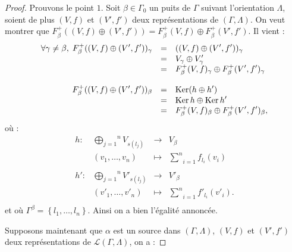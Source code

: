 \documentclass[a4paper,11pt]{article}
\DeclareMathOperator{\Ker}{Ker}
\newcommand{\dps}{\displaystyle}
\begin{document}
\begin{proof}
	Prouvons le point $1$. Soit $\beta\in\Gamma_{0}$ un puits de $\Gamma$ suivant l'orientation $\Lambda$, soient de plus $(V,f)$ et $(V',f')$ deux représentations de $(\Gamma,\Lambda)$. On veut montrer que $F_{\beta}^{+}((V,f)\oplus(V',f'))=F_{\beta}^{+}(V,f)\oplus F_{\beta}^{+}(V',f')$. Il vient :
	\[
\begin{array}{>{\dps}r>{\dps}l>{\dps}l}
	\forall\gamma\neq\beta,\;F_{\beta}^{+}((V,f)\oplus(V',f'))_{\gamma}&=&((V,f)\oplus(V',f'))_{\gamma}\\
	&=& V_{\gamma}\oplus V_{\gamma}'\\
	&=&  F_{\beta}^{+}(V,f)_{\gamma}\oplus F_{\beta}^{+}(V',f')_{\gamma}\\
	&&\\
	F_{\beta}^{+}((V,f)\oplus(V',f'))_{\beta}&=&\Ker(h\oplus h')\\
	&=& \Ker h \oplus \Ker h'\\
	&=&  F_{\beta}^{+}(V,f)_{\beta}\oplus F_{\beta}^{+}(V',f')_{\beta},
\end{array}
	\]
où :
\[
\begin{array}{lccc}
	h : & \overset{n}{\underset{j=1}{\bigoplus}}V_{s(l_{j})}&\rightarrow & V_{\beta} \\ 
	& (v_{1},\dots,v_{n})&\mapsto & \underset{i=1}{\overset{n}{\sum}}f_{l_{i}}(v_{i})\\
	&&&\\
	h' : & \overset{n}{\underset{j=1}{\bigoplus}}V'_{s(l_{j})}&\rightarrow & V'_{\beta} \\ 
	& (v'_{1},\dots,v'_{n})&\mapsto & \underset{i=1}{\overset{n}{\sum}}f'_{l_{i}}(v'_{i}).\\
\end{array}
	\]
	et où $\Gamma^{\beta}=\left\{ l_{1},\dots,l_{n} \right\}$. Ainsi on a bien l'égalité annoncée.

Supposons maintenant que $\alpha$ est un source dans $(\Gamma,\Lambda)$, $(V,f)$ et $(V',f')$ deux représentations de $\mathscr L(\Gamma,\Lambda)$, on a : 


\end{proof}
\end{document}
